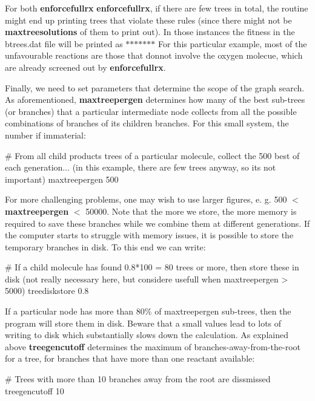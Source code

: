 For both {\bfseries enforcefullrx} {\bfseries enforcefullrx}, if there are few trees in total, the routine might end up printing trees that violate these rules (since there might not be {\bfseries maxtreesolutions} of them to print out). In those instances the fitness in the btrees.\+dat file will be printed as $\ast$$\ast$$\ast$$\ast$$\ast$$\ast$$\ast$ For this particular example, most of the unfavourable reactions are those that donnot involve the oxygen molecue, which are already screened out by {\bfseries enforcefullrx}.

Finally, we need to set parameters that determine the scope of the graph search. As aforementioned, {\bfseries maxtreepergen} determines how many of the best sub-\/trees (or branches) that a particular intermediate node collects from all the possible combinations of branches of its children branches. For this small system, the number if immaterial\+: \begin{DoxyVerb}#  From all child products trees of a particular molecule, collect the 500 best of each generation... (in this example, there are few trees anyway, so its not important)
maxtreepergen 500
\end{DoxyVerb}


For more challenging problems, one may wish to use larger figures, e. g. 500 $<$ {\bfseries maxtreepergen} $<$ 50000. Note that the more we store, the more memory is required to save these branches while we combine them at different generations. If the computer starts to struggle with memory issues, it is possible to store the temporary branches in disk. To this end we can write\+: \begin{DoxyVerb}#  If a child molecule has found 0.8*100 = 80 trees or more, then store these in disk (not really necessary here, but considere usefull when maxtreepergen > 5000)
treediskstore 0.8
\end{DoxyVerb}


If a particular node has more than 80\% of maxtreepergen sub-\/trees, then the program will store them in disk. Beware that a small values lead to lots of writing to disk which substantially slows down the calculation. As explained above {\bfseries treegencutoff} determines the maximum of branches-\/away-\/from-\/the-\/root for a tree, for branches that have more than one reactant available\+: \begin{DoxyVerb}#  Trees with more than 10 branches away from the root are dissmissed
treegencutoff 10
\end{DoxyVerb}


